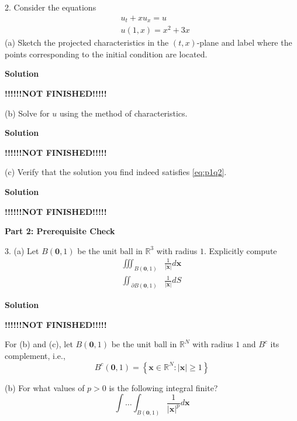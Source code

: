 \documentclass{article}
\begin{document}
\vspace{5mm}
2. Consider the equations
%
\begin{equation}
    \begin{aligned}
        &u_{t} + x u_{x} = u \\
        &u(1, x) = x^2 + 3 x
    \end{aligned}
    \label{eq:p1q2}
\end{equation}
%
(a) Sketch the projected characteristics in the $(t, x)$-plane and label
where the points corresponding to the initial condition are located.

\textbf{Solution}

\quad \textbf{!!!!!!NOT FINISHED!!!!!}

\vspace{5mm}
(b) Solve for $u$ using the method of characteristics.

\textbf{Solution}

\quad \textbf{!!!!!!NOT FINISHED!!!!!}

\vspace{5mm}
(c) Verify that the solution you find indeed satisfies \eqref{eq:p1q2}.

\textbf{Solution}

\quad \textbf{!!!!!!NOT FINISHED!!!!!}

\vspace{5mm}
\textbf{Part 2: Prerequisite Check}

3. (a) Let $B(\mathbf{0},1)$ be the unit ball in $\mathbb{R}^{3}$ with
   radius $1$. Explicitly compute
%
\begin{align}
    \iiint_{B(\mathbf{0},1)} &\frac{1}{|\mathbf{x}|} d \mathbf{x}
    \label{eq:p2q3a1} \\
    \iint_{\partial B(\mathbf{0},1)} &\frac{1}{|\mathbf{x}|} d S
    \label{eq:p2q3a2}
\end{align}

\textbf{Solution}

\quad \textbf{!!!!!!NOT FINISHED!!!!!}

\vspace{5mm}
For (b) and (c), let $B(\mathbf{0},1)$ be the unit ball in
$\mathbb{R}^{N}$ with radius $1$ and $B^{c}$ its complement, i.e.,
$$B^{c}(\mathbf{0}, 1) = \left\{\mathbf{x} \in \mathbb{R}^{N}: |\mathbf{x}| \geq 1 \right\}$$

(b) For what values of $p > 0$ is the following integral finite?
\begin{equation}
    \int \ldots \int_{B(\mathbf{0}, 1)} \frac{1}{|\mathbf{x}|^{p}} d \mathbf{x}
    \label{eq:p2q3b}
\end{equation}
\end{document}
